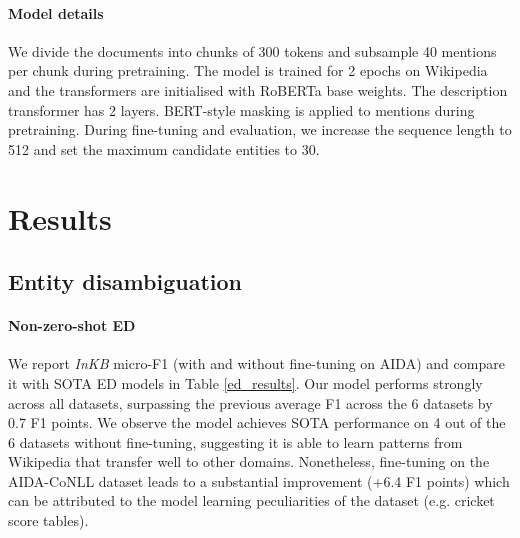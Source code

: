 \documentclass[11pt]{article}
\begin{document}
\paragraph{Model details}
We divide the documents into chunks of 300 tokens and subsample 40 mentions per chunk during pretraining. The model is trained for 2 epochs on Wikipedia and the transformers are initialised with RoBERTa \citep{roberta} base weights. The description transformer has 2 layers. BERT-style masking \citep{devlin-etal-2019-bert} is applied to mentions during pretraining. During fine-tuning and evaluation, we increase the sequence length to 512 and set the maximum candidate entities to 30.



\section{Results}





\subsection{Entity disambiguation}
\paragraph{Non-zero-shot ED} \label{ed_results_para}
We report \emph{InKB} micro-F1 (with and without fine-tuning on AIDA) and compare it with SOTA ED models in Table \ref{ed_results}. Our model performs strongly across all datasets, surpassing the previous average F1 across the 6 datasets by 0.7 F1 points. We observe the model achieves SOTA performance on 4 out of the 6 datasets without fine-tuning, suggesting it is able to learn patterns from Wikipedia that transfer well to other domains. Nonetheless, fine-tuning on the AIDA-CoNLL dataset leads to a substantial improvement (+6.4 F1 points) which can be attributed to the model learning peculiarities of the dataset (e.g. cricket score tables).
\end{document}

